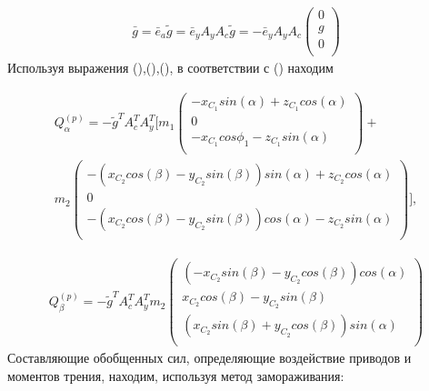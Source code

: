 \begin{equation} %
\label{eq:p3:35}
\begin{multlined}
\bar{g}=\bar{e}_{a}\tilde{g}=\bar{e}_{y}A_{y}A_{c}\tilde{g}=-\bar{e}_{y}A_{y}A_{c} \left( \begin{matrix}
0\\
g\\
0\\
\end{matrix}
\right) 
\end{multlined}
\end{equation}
Используя выражения (),(),(), в соответствии с () находим 


\begin{equation} %
\label{eq:p3:36}
\begin{multlined}
Q_{ \alpha }^{ \left( p \right) }=
-\tilde{g}^{T}A_{c}^{T}A_{y}^{T} 
[ 
m_{1} \left( 
\begin{matrix}
	-x_{C_{1}}sin \left( \alpha \right) +z_{C_{1}}cos \left( \alpha \right) \\
	0\\
	-x_{C_{1}}cos \phi _{1}-z_{C_{1}}sin \left( \alpha \right) \\
\end{matrix}
\right) + \\
m_{2} \left( 
\begin{matrix}
	- \left( x_{C_{2}}cos \left( \beta \right) -y_{C_{2}}sin \left( \beta \right) \right) sin \left( \alpha \right) +z_{C_{2}}cos \left( \alpha \right) \\
	0\\
	- \left( x_{C_{2}}cos \left( \beta \right) -y_{C_{2}}sin \left( \beta \right) \right) cos \left( \alpha \right) -z_{C_{2}}sin \left( \alpha \right) \\
\end{matrix}
\right) 
],
\end{multlined}
\end{equation}

\vspace{\baselineskip}

\begin{equation} %
\label{eq:p3:37}
\begin{multlined}
Q_{ \beta }^{ \left( p \right) }=-\tilde{g}^{T}A_{c}^{T}A_{y}^{T}m_{2} \left( \begin{matrix}
\left( -x_{C_{2}}sin \left( \beta \right) -y_{C_{2}}cos \left( \beta \right) \right) cos \left( \alpha \right) \\
x_{C_{2}}cos \left( \beta \right) -y_{C_{2}}sin \left( \beta \right) \\
\left( x_{C_{2}}sin \left( \beta \right) +y_{C_{2}}cos \left( \beta \right) \right) sin \left( \alpha \right) \\
\end{matrix}
\right) 
\end{multlined}
\end{equation}
Составляющие обобщенных сил, определяющие воздействие приводов и моментов трения, находим, используя метод замораживания: 


